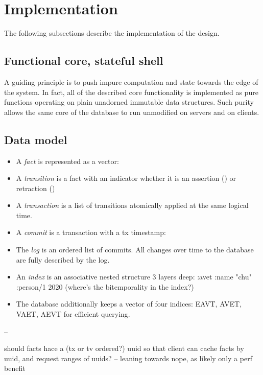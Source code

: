 \section{Implementation}\label{sec:implementation}

The following subsections describe the implementation of the design.

\subsection{Functional core, stateful shell}

A guiding principle is to push impure computation and state towards the edge of the system. In fact, all of the described core functionality is implemented as pure functions operating on plain unadorned immutable data structures. Such purity allows the same core of the database to run unmodified on servers and on clients.


\subsection{Data model}

\begin{itemize}
\item A \emph{fact} is represented as a vector: \lisp{[e a v tv]}
\item A \emph{transition} is a fact with an indicator whether it is an assertion (\lisp{:+}) or retraction (\lisp{:-}) \lisp{[:+ e a v tv]}
\item A \emph{transaction} is a list of transitions atomically applied at the same logical time. \lisp{[[:+ ...] [:- ...] [:+...]]}
\item A \emph{commit} is a transaction with a tx timestamp: \lisp{[2020 [:+ ...] [:- ...] [:+...]]}
\item The \emph{log} is an ordered list of commits. All changes over time to the database are fully described by the log.
\item An \emph{index} is an associative nested structure 3 layers deep: {:avet {:name {"chu" {:person/1 2020}}}} (where's the bitemporality in the index?)
\item The database additionally keeps a vector of four indices: EAVT, AVET, VAET, AEVT for efficient querying.
\end{itemize}


--

should facts hace a (tx or tv ordered?) uuid so that client can cache facts by uuid,
and request ranges of uuids?
-- leaning towards nope, as likely only a perf benefit


